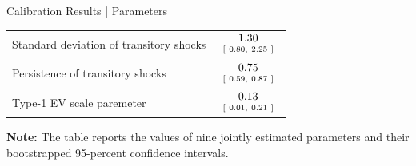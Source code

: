 \documentclass[9pt,pdftex,aspectratio=1610]{beamer}
\theoremstyle{definition}
\begin{document}
\begin{frame}[t]{Calibration Results | Parameters }
\begin{table}[!t]
\begin{center}
\begin{tabular}{l c }
Standard deviation of transitory shocks     & $\begin{array}{c}1.30 \vspace{-.1cm}\\ \scriptstyle [ \ 0.80, \ 2.25\  ] \end{array}$  \\
Persistence of transitory shocks            & $\begin{array}{c}0.75\vspace{-.1cm}\\ \scriptstyle [ \ 0.59, \ 0.87\  ]  \end{array}$ \\
Type-1 EV scale paremeter                   & $\begin{array}{c}0.13\vspace{-.1cm}\\ \scriptstyle [ \ 0.01, \ 0.21\  ]    \end{array}$ \\
\hline
\end{tabular}
\parbox[c]{2.85in}{\vspace{0.1cm}
{\footnotesize  \textbf{Note:} The table reports the values of nine jointly estimated parameters and their bootstrapped 95-percent confidence intervals.}}
\end{center}
\end{table}
\end{frame}
\end{document}
